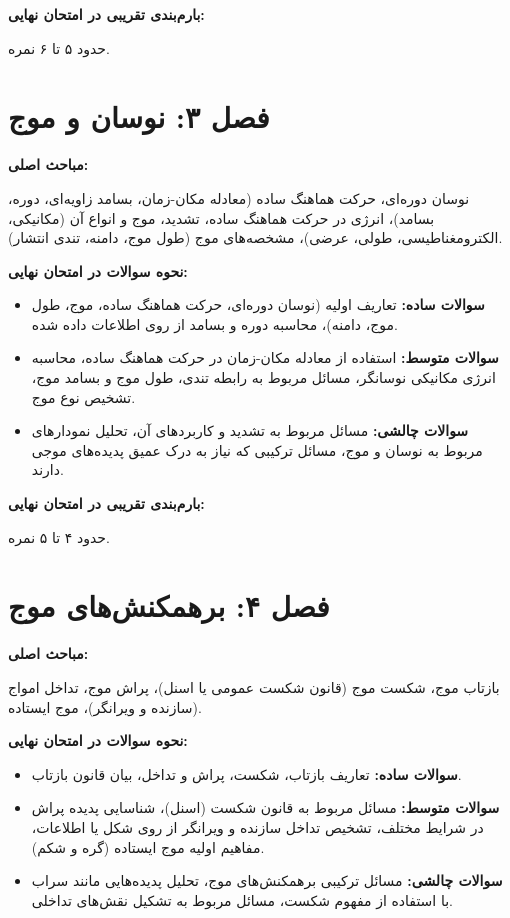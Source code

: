 \documentclass[12pt]{article}
\newcommand{\parahead}[1]{\par\vspace{0.5ex}\noindent\textbf{#1}\par\nopagebreak[4]\vspace{0.5ex}}
\begin{document}
\parahead{بارم‌بندی تقریبی در امتحان نهایی:}
حدود ۵ تا ۶ نمره.

\section{فصل ۳: نوسان و موج}

\parahead{مباحث اصلی:}
نوسان دوره‌ای، حرکت هماهنگ ساده (معادله مکان-زمان، بسامد زاویه‌ای، دوره، بسامد)، انرژی در حرکت هماهنگ ساده، تشدید، موج و انواع آن (مکانیکی، الکترومغناطیسی، طولی، عرضی)، مشخصه‌های موج (طول موج، دامنه، تندی انتشار).

\parahead{نحوه سوالات در امتحان نهایی:}
\begin{itemize}
    \item \textbf{سوالات ساده:} تعاریف اولیه (نوسان دوره‌ای، حرکت هماهنگ ساده، موج، طول موج، دامنه)، محاسبه دوره و بسامد از روی اطلاعات داده شده.
    \item \textbf{سوالات متوسط:} استفاده از معادله مکان-زمان در حرکت هماهنگ ساده، محاسبه انرژی مکانیکی نوسانگر، مسائل مربوط به رابطه تندی، طول موج و بسامد موج، تشخیص نوع موج.
    \item \textbf{سوالات چالشی:} مسائل مربوط به تشدید و کاربردهای آن، تحلیل نمودارهای مربوط به نوسان و موج، مسائل ترکیبی که نیاز به درک عمیق پدیده‌های موجی دارند.
\end{itemize}

\parahead{بارم‌بندی تقریبی در امتحان نهایی:}
حدود ۴ تا ۵ نمره.

\section{فصل ۴: برهمکنش‌های موج}

\parahead{مباحث اصلی:}
بازتاب موج، شکست موج (قانون شکست عمومی یا اسنل)، پراش موج، تداخل امواج (سازنده و ویرانگر)، موج ایستاده.

\parahead{نحوه سوالات در امتحان نهایی:}
\begin{itemize}
    \item \textbf{سوالات ساده:} تعاریف بازتاب، شکست، پراش و تداخل، بیان قانون بازتاب.
    \item \textbf{سوالات متوسط:} مسائل مربوط به قانون شکست (اسنل)، شناسایی پدیده پراش در شرایط مختلف، تشخیص تداخل سازنده و ویرانگر از روی شکل یا اطلاعات، مفاهیم اولیه موج ایستاده (گره و شکم).
    \item \textbf{سوالات چالشی:} مسائل ترکیبی برهمکنش‌های موج، تحلیل پدیده‌هایی مانند سراب با استفاده از مفهوم شکست، مسائل مربوط به تشکیل نقش‌های تداخلی.
\end{itemize}
\end{document}
